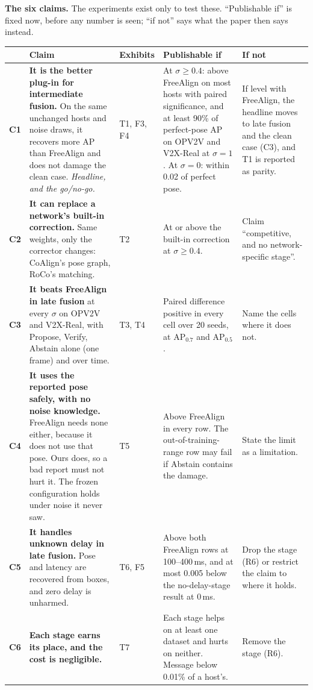 \begin{table}[t]
  \centering\small
  \raggedright\textbf{The six claims.} The experiments exist only to test these. ``Publishable if'' is fixed now, before any number is seen; ``if not'' says what the paper then says instead.\par\medskip\centering
  \begin{tabular}{@{}l p{5.6cm} l p{4.6cm} p{4.0cm}@{}}
    \toprule
    & Claim & Exhibits & Publishable if & If not \\
    \midrule
    \textbf{C1} & \textbf{It is the better plug-in for intermediate fusion.} On the same unchanged hosts and noise draws, it recovers more AP than FreeAlign and does not damage the clean case. \emph{Headline, and the go/no-go.} & T1, F3, F4 & At $\sigma\geq 0.4$: above FreeAlign on most hosts with paired significance, and at least 90\% of perfect-pose AP on OPV2V and V2X-Real at $\sigma=1$. At $\sigma=0$: within 0.02 of perfect pose. & If level with FreeAlign, the headline moves to late fusion and the clean case (C3), and T1 is reported as parity. \\
    \textbf{C2} & \textbf{It can replace a network's built-in correction.} Same weights, only the corrector changes: CoAlign's pose graph, RoCo's matching. & T2 & At or above the built-in correction at $\sigma\geq 0.4$. & Claim ``competitive, and no network-specific stage''. \\
    \textbf{C3} & \textbf{It beats FreeAlign in late fusion} at every $\sigma$ on OPV2V and V2X-Real, with Propose, Verify, Abstain alone (one frame) and over time. & T3, T4 & Paired difference positive in every cell over 20 seeds, at AP$_{0.7}$ and AP$_{0.5}$. & Name the cells where it does not. \\
    \textbf{C4} & \textbf{It uses the reported pose safely, with no noise knowledge.} FreeAlign needs none either, because it does not use that pose. Ours does, so a bad report must not hurt it. The frozen configuration holds under noise it never saw. & T5 & Above FreeAlign in every row. The out-of-training-range row may fail if Abstain contains the damage. & State the limit as a limitation. \\
    \textbf{C5} & \textbf{It handles unknown delay in late fusion.} Pose and latency are recovered from boxes, and zero delay is unharmed. & T6, F5 & Above both FreeAlign rows at 100--400\,ms, and at most 0.005 below the no-delay-stage result at 0\,ms. & Drop the stage (R6) or restrict the claim to where it holds. \\
    \textbf{C6} & \textbf{Each stage earns its place, and the cost is negligible.} & T7 & Each stage helps on at least one dataset and hurts on neither. Message below 0.01\% of a host's. & Remove the stage (R6). \\
    \bottomrule
  \end{tabular}
\end{table}

\clearpage
